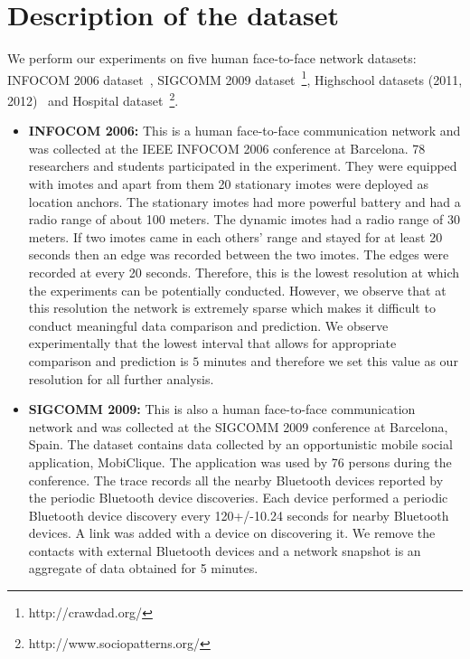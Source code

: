 \noindent
\section{Description of the dataset}
\label{dataset}
We perform our experiments on five human face-to-face network datasets: INFOCOM 2006 dataset~\cite{cambridge-haggle-imote-infocom2006-2009-05-29}, SIGCOMM 2009 dataset~\cite{thlab-sigcomm2009-mobiclique-proximity-2012-07-15}\footnote{http://crawdad.org/}, 
Highschool datasets (2011, 2012)~\cite{fournet2014contact} and Hospital dataset~\cite{vanhems2013estimating}\footnote{http://www.sociopatterns.org/}.


\begin{itemize}
\item {\bf INFOCOM 2006:}
This is a human face-to-face communication network and was collected at the IEEE INFOCOM 2006 conference at Barcelona.
78 researchers and students participated in the experiment. They were equipped with imotes and apart from them 20 stationary imotes were deployed as 
location anchors. The stationary imotes had more powerful battery and had a radio range of about 100 meters. The dynamic imotes had a radio range of 30 meters.
If two imotes came in each others' range and stayed for at least 20 seconds then an edge was recorded between the two imotes.
The edges were recorded at every 20 seconds. 
Therefore, this is the lowest resolution at which the experiments can be potentially conducted. However, we observe that at this resolution the network is extremely sparse 
which makes it difficult to conduct meaningful data comparison and prediction. We observe experimentally that the lowest interval that allows for appropriate comparison 
and prediction is $5$ minutes and therefore we set this value as our resolution for all further analysis.
 \item {\bf SIGCOMM 2009:}
 This is also a human face-to-face communication network and was collected at the SIGCOMM 2009 conference at Barcelona, Spain. The dataset contains data collected by an opportunistic mobile social 
application, MobiClique. The application was used by 76 persons during the conference. The trace records all the nearby Bluetooth devices reported by the periodic 
Bluetooth device discoveries.
Each device performed a periodic Bluetooth device discovery every 120+/-10.24 seconds for nearby Bluetooth devices. A link was added with a device 
on discovering it. 
We remove the contacts with external Bluetooth 
devices and a network snapshot is an aggregate of data obtained for 5 minutes. 


\end{itemize}
